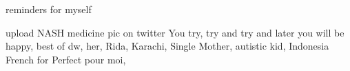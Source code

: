 reminders for myself

upload NASH medicine pic on twitter
You try, try and try and later you will be happy, best of dw, her, Rida, Karachi, Single Mother, autistic kid, Indonesia
French for Perfect pour moi, 
